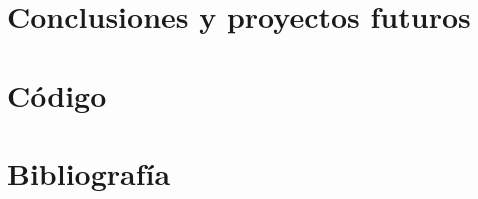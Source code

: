 \section{Conclusiones y proyectos futuros} 

\newpage

\section{Código}

\newpage
\section{Bibliografía}







\appendix
\clearpage
\addappheadtotoc
\appendixpage



 


